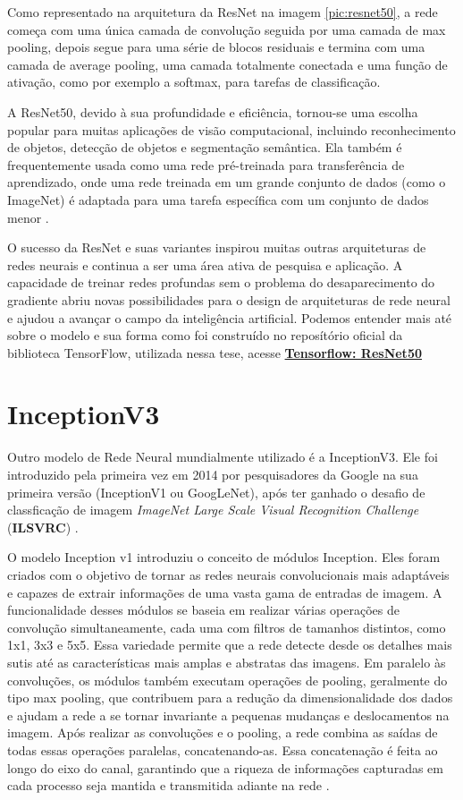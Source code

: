 Como representado na arquitetura da ResNet na imagem \ref{pic:resnet50}, a rede começa com uma única camada de convolução seguida por uma camada de max pooling, depois segue para uma série de blocos residuais e termina com uma camada de average pooling, uma camada totalmente conectada e uma função de ativação, como por exemplo a softmax, para tarefas de classificação.

A ResNet50, devido à sua profundidade e eficiência, tornou-se uma escolha popular para muitas aplicações de visão computacional, incluindo reconhecimento de objetos, detecção de objetos e segmentação semântica. Ela também é frequentemente usada como uma rede pré-treinada para transferência de aprendizado, onde uma rede treinada em um grande conjunto de dados (como o ImageNet) é adaptada para uma tarefa específica com um conjunto de dados menor \cite{Sharma2022Enhanced}.

O sucesso da ResNet e suas variantes inspirou muitas outras arquiteturas de redes neurais e continua a ser uma área ativa de pesquisa e aplicação. A capacidade de treinar redes profundas sem o problema do desaparecimento do gradiente abriu novas possibilidades para o design de arquiteturas de rede neural e ajudou a avançar o campo da inteligência artificial. Podemos entender mais até sobre o modelo e sua forma como foi construído no reposítório oficial da biblioteca TensorFlow, utilizada nessa tese, acesse \href{https://github.com/tensorflow/tpu/tree/master/models/experimental/resnet50_keras}{\textbf{Tensorflow: ResNet50}}


\section{InceptionV3}

Outro modelo de Rede Neural mundialmente utilizado é a InceptionV3. Ele foi introduzido pela primeira vez em 2014 por pesquisadores da Google na sua primeira versão (InceptionV1 ou GoogLeNet), após ter ganhado o desafio de classficação de imagem \textit{ImageNet Large Scale Visual Recognition Challenge} (\textbf{ILSVRC}) \cite{Szegedy2015RethinkingTI}. 

O modelo Inception v1 introduziu o conceito de módulos Inception. Eles foram criados com o objetivo de tornar as redes neurais convolucionais mais adaptáveis e capazes de extrair informações de uma vasta gama de entradas de imagem. A funcionalidade desses módulos se baseia em realizar várias operações de convolução simultaneamente, cada uma com filtros de tamanhos distintos, como 1x1, 3x3 e 5x5. Essa variedade permite que a rede detecte desde os detalhes mais sutis até as características mais amplas e abstratas das imagens. Em paralelo às convoluções, os módulos também executam operações de pooling, geralmente do tipo max pooling, que contribuem para a redução da dimensionalidade dos dados e ajudam a rede a se tornar invariante a pequenas mudanças e deslocamentos na imagem. Após realizar as convoluções e o pooling, a rede combina as saídas de todas essas operações paralelas, concatenando-as. Essa concatenação é feita ao longo do eixo do canal, garantindo que a riqueza de informações capturadas em cada processo seja mantida e transmitida adiante na rede \cite{7298594}.

